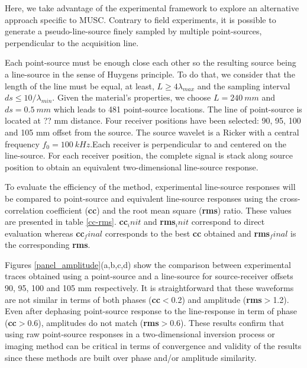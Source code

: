 \documentclass[manuscript,revised]{geophysics}
\newcommand{\twod}{two-dimensional }
\begin{document}
\noindent Here, we take advantage of the experimental framework to explore an alternative approach specific to MUSC. Contrary to field experiments, it is possible to generate a pseudo-line-source finely sampled by multiple point-sources, perpendicular to the acquisition line. 

\noindent Each point-source must be enough close each other so the resulting source being a line-source in the sense of Huygens principle. To do that, we consider that the length of the line must be equal, at least, $L \geq 4\lambda_{max}$ and the sampling interval $ds \leq 10 / \lambda_{min}$. Given the material's properties, we choose $L=240\ mm$ and $ds=0.5\ mm$ which leads to 481 point-source locations. The line of point-source is located at ?? mm distance. Four receiver positions have been selected: 90, 95, 100 and 105 mm offset from the source. The source wavelet is a Ricker with a central frequency $f_{0}=100\ kHz$.Each receiver is perpendicular to and centered on the line-source. For each receiver position, the complete signal is stack along source position to obtain an equivalent \twod line-source response.
 
\noindent To evaluate the efficiency of the method, experimental line-source responses will be compared to point-source and equivalent line-source responses using the cross-correlation coefficient (\textbf{cc}) and the root mean square (\textbf{rms}) ratio. These values are presented in table \ref{cc-rms}. \textbf{cc}$_init$ and \textbf{rms}$_init$ correspond to direct evaluation whereas \textbf{cc}$_final$ corresponds to the best \textbf{cc} obtained and \textbf{rms}$_final$ is the corresponding \textbf{rms}.

\noindent Figures \ref{panel_amplitude}(a,b,c,d) show the comparison between experimental traces obtained using a point-source and a line-source for source-receiver offsets 90, 95, 100 and 105 mm respectively. It is straightforward that these waveforms are not similar in terms of both phases (\textbf{cc}$<$0.2) and amplitude (\textbf{rms}$>$1.2). Even after dephasing point-source response to the line-response in term of phase (\textbf{cc}$>$0.6), amplitudes do not match (\textbf{rms}$>$0.6). These results confirm that using raw point-source responses in a \twod inversion process or imaging method can be critical in terms of convergence and validity of the results since these methods are built over phase and/or amplitude similarity.
\end{document}

